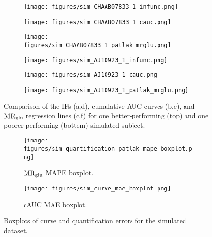 \begin{figure}[h]
	\centering
	\begin{subfigure}[b]{0.322\textwidth}
		\texttt{[image: figures/sim\_CHAAB07833\_1\_infunc.png]}
		\caption{}
	\end{subfigure}
	\begin{subfigure}[b]{0.322\textwidth}
		\texttt{[image: figures/sim\_CHAAB07833\_1\_cauc.png]}
		\caption{}
	\end{subfigure}
	\begin{subfigure}[b]{0.322\textwidth}
		\texttt{[image: figures/sim\_CHAAB07833\_1\_patlak\_mrglu.png]}
		\caption{}
	\end{subfigure}
	\begin{subfigure}[b]{0.322\textwidth}
		\texttt{[image: figures/sim\_AJ10923\_1\_infunc.png]}
		\caption{}
	\end{subfigure}
	\begin{subfigure}[b]{0.322\textwidth}
		\texttt{[image: figures/sim\_AJ10923\_1\_cauc.png]}
		\caption{}
	\end{subfigure}
	\begin{subfigure}[b]{0.322\textwidth}
		\texttt{[image: figures/sim\_AJ10923\_1\_patlak\_mrglu.png]}
		\caption{}
	\end{subfigure}
	\caption{Comparison of the IFs (a,d), cumulative AUC curves (b,e), and \(\text{MR}_{\text{glu}}\) regression lines (c,f) for one better-performing (top) and one poorer-performing (bottom) simulated subject.}
	\label{fig:sim_ifs}
\end{figure}


\begin{figure}[h]
	\centering
	\begin{subfigure}[b]{0.45\textwidth}
		\texttt{[image: figures/sim\_quantification\_patlak\_mape\_boxplot.png]}
		\caption{\(\text{MR}_{\text{glu}}\) MAPE boxplot.}
		\label{subfig:sim_mape_boxplot}
	\end{subfigure}
	\begin{subfigure}[b]{0.45\textwidth}
		\texttt{[image: figures/sim\_curve\_mae\_boxplot.png]}
		\caption{cAUC MAE boxplot.}
		\label{subfig:sim_cauc_boxplot}
	\end{subfigure}
	\caption{Boxplots of curve and quantification errors for the simulated dataset.}
\end{figure}

